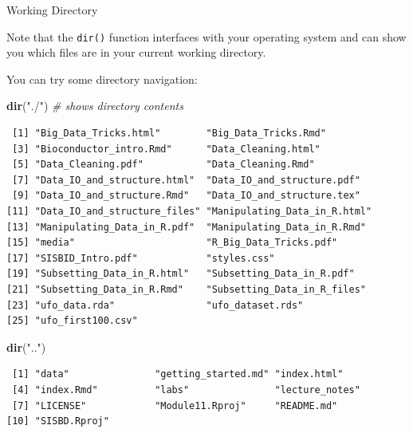 \documentclass[
  ignorenonframetext,
]{beamer}
\newenvironment{Shaded}{\begin{snugshade}}{\end{snugshade}}
\newcommand{\CommentTok}[1]{\textcolor[rgb]{0.56,0.35,0.01}{\textit{#1}}}
\newcommand{\KeywordTok}[1]{\textcolor[rgb]{0.13,0.29,0.53}{\textbf{#1}}}
\newcommand{\NormalTok}[1]{#1}
\newcommand{\StringTok}[1]{\textcolor[rgb]{0.31,0.60,0.02}{#1}}
\begin{document}
\begin{frame}[fragile]{Working Directory}
\protect\hypertarget{working-directory}{}

Note that the \texttt{dir()} function interfaces with your operating
system and can show you which files are in your current working
directory.

You can try some directory navigation:

\begin{Shaded}
\begin{Highlighting}[]
\KeywordTok{dir}\NormalTok{(}\StringTok{"./"}\NormalTok{) }\CommentTok{# shows directory contents}
\end{Highlighting}
\end{Shaded}

\begin{verbatim}
 [1] "Big_Data_Tricks.html"        "Big_Data_Tricks.Rmd"        
 [3] "Bioconductor_intro.Rmd"      "Data_Cleaning.html"         
 [5] "Data_Cleaning.pdf"           "Data_Cleaning.Rmd"          
 [7] "Data_IO_and_structure.html"  "Data_IO_and_structure.pdf"  
 [9] "Data_IO_and_structure.Rmd"   "Data_IO_and_structure.tex"  
[11] "Data_IO_and_structure_files" "Manipulating_Data_in_R.html"
[13] "Manipulating_Data_in_R.pdf"  "Manipulating_Data_in_R.Rmd" 
[15] "media"                       "R_Big_Data_Tricks.pdf"      
[17] "SISBID_Intro.pdf"            "styles.css"                 
[19] "Subsetting_Data_in_R.html"   "Subsetting_Data_in_R.pdf"   
[21] "Subsetting_Data_in_R.Rmd"    "Subsetting_Data_in_R_files" 
[23] "ufo_data.rda"                "ufo_dataset.rds"            
[25] "ufo_first100.csv"           
\end{verbatim}

\begin{Shaded}
\begin{Highlighting}[]
\KeywordTok{dir}\NormalTok{(}\StringTok{".."}\NormalTok{)}
\end{Highlighting}
\end{Shaded}

\begin{verbatim}
 [1] "data"               "getting_started.md" "index.html"        
 [4] "index.Rmd"          "labs"               "lecture_notes"     
 [7] "LICENSE"            "Module11.Rproj"     "README.md"         
[10] "SISBD.Rproj"       
\end{verbatim}

\end{frame}
\end{document}
